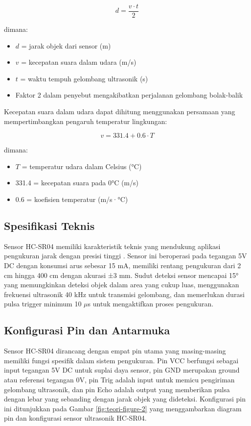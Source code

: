 \begin{equation}
    d = \frac{v \cdot t}{2}
\end{equation}

dimana:
\begin{itemize}
    \item $d$ = jarak objek dari sensor (m)
    \item $v$ = kecepatan suara dalam udara (m/s)
    \item $t$ = waktu tempuh gelombang ultrasonik (s)
    \item Faktor 2 dalam penyebut mengakibatkan perjalanan gelombang bolak-balik
\end{itemize}

Kecepatan suara dalam udara dapat dihitung menggunakan persamaan yang mempertimbangkan pengaruh temperatur lingkungan:

\begin{equation}
    v = 331.4 + 0.6 \cdot T
\end{equation}

dimana:
\begin{itemize}
    \item $T$ = temperatur udara dalam Celsius (°C)
    \item 331.4 = kecepatan suara pada 0°C (m/s)
    \item 0.6 = koefisien temperatur (m/s·°C)
\end{itemize}

\subsection{Spesifikasi Teknis}
Sensor HC-SR04 memiliki karakteristik teknis yang mendukung aplikasi pengukuran jarak dengan presisi tinggi \citep{siregar2021sensor}. Sensor ini beroperasi pada tegangan 5V DC dengan konsumsi arus sebesar 15 mA, memiliki rentang pengukuran dari 2 cm hingga 400 cm dengan akurasi ±3 mm. Sudut deteksi sensor mencapai 15° yang memungkinkan deteksi objek dalam area yang cukup luas, menggunakan frekuensi ultrasonik 40 kHz untuk transmisi gelombang, dan memerlukan durasi pulsa trigger minimum 10 $\mu$s untuk mengaktifkan proses pengukuran.

\subsection{Konfigurasi Pin dan Antarmuka}
Sensor HC-SR04 dirancang dengan empat pin utama yang masing-masing memiliki fungsi spesifik dalam sistem pengukuran. Pin VCC berfungsi sebagai input tegangan 5V DC untuk suplai daya sensor, pin GND merupakan ground atau referensi tegangan 0V, pin Trig adalah input untuk memicu pengiriman gelombang ultrasonik, dan pin Echo adalah output yang memberikan pulsa dengan lebar yang sebanding dengan jarak objek yang dideteksi. Konfigurasi pin ini ditunjukkan pada Gambar \ref{fig:teori-figure-2} yang menggambarkan diagram pin dan konfigurasi sensor ultrasonik HC-SR04.

